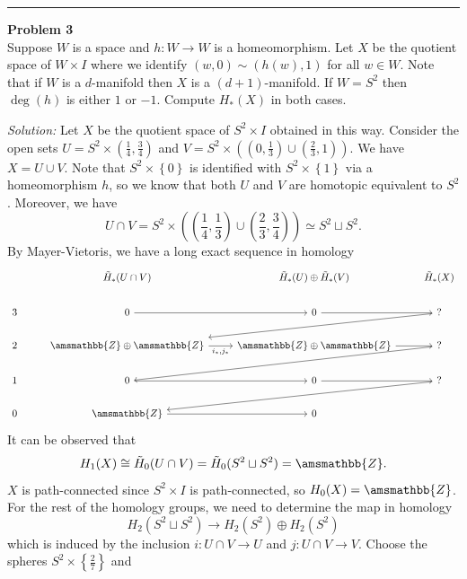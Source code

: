 \documentclass[letterpaper, 12pt]{article}
\newenvironment{problem}[2][Problem]
		{ \begin{mdframed}[backgroundcolor=gray!20] \textbf{#1 #2} \\}
		{  \end{mdframed}}
\newenvironment{solution}
		{\textit{Solution:}}
		{}
\renewcommand{\mathbb}{\amsmathbb}
\begin{document}
\noindent\rule{7in}{2.8pt}
\begin{problem}{3}
Suppose \(W\) is a space and \(h:W\rightarrow W\) is a homeomorphism. Let \(X\) be the quotient space of \(W\times I\) where we identify \((w,0)\sim (h(w),1)\) for all \(w\in W\). Note that 
if \(W\) is a \(d\)-manifold then \(X\) is a \((d+1)\)-manifold. If \(W=S^2\) then \(\deg(h)\) is either \(1\) or \(-1\). Compute \(H_*(X)\) in both cases. 
\end{problem}
\begin{solution}
Let \(X\) be the quotient space of \(S^2\times I\) obtained in this way. Consider the open sets \(U=S^2\times (\frac{1}{4},\frac{3}{4})\) and \(V=S^2\times ((0,\frac{1}{3})\cup (\frac{2}{3},1))\). We have \(X=U\cup V\). Note that \(S^2\times \left\{ 0 \right\}\) is identified with 
\(S^2\times \left\{ 1 \right\}\) via a homeomorphism \(h\), so we know that both \(U\) and \(V\) are homotopic equivalent to \(S^2\). Moreover, we have 
\[U\cap V=S^2\times ((\frac{1}{4},\frac{1}{3})\cup(\frac{2}{3},\frac{3}{4}))\simeq S^2\sqcup S^2.\]
By Mayer-Vietoris, we have a long exact sequence in homology 
\[\begin{tikzcd}
	& {\tilde{H}_*(U\cap V)} & {\tilde{H}_*(U)\oplus \tilde{H}_*(V)} & {\tilde{H}_*(X)} \\
	3 & 0 & 0 & {?} \\
	2 & {\mathbb{Z}\oplus\mathbb{Z}} & {\mathbb{Z}\oplus\mathbb{Z}} & {?} \\
	1 & 0 & 0 & {?} \\
	0 & {\mathbb{Z}} & 0
	\arrow[from=2-2, to=2-3]
	\arrow[from=2-3, to=2-4]
	\arrow[from=2-4, to=3-2]
	\arrow["{i_*,j_*}"', from=3-2, to=3-3]
	\arrow[from=3-3, to=3-4]
	\arrow[from=3-4, to=4-2]
	\arrow[from=4-2, to=4-3]
	\arrow[from=4-3, to=4-4]
	\arrow[from=4-4, to=5-2]
	\arrow[from=5-2, to=5-3]
\end{tikzcd}\]
It can be observed that 
\[H_1(X)\cong \tilde{H}_0(U\cap V)=\tilde{H}_0(S^2\sqcup S^2)=\mathbb{Z}.\]
\(X\) is path-connected since \(S^2\times I\) is path-connected, so \(H_0(X)=\mathbb{Z}\). For the rest of the homology groups, we need to determine the map in homology 
\[H_2(S^2\sqcup S^2)\rightarrow H_2(S^2)\oplus H_2(S^2)\]
which is induced by the inclusion \(i:U\cap V\rightarrow U\) and \(j:U\cap V\rightarrow V\). Choose the spheres \(S^2\times \left\{ \frac{2}{7} \right\}\) and 

\end{solution}
\end{document}
